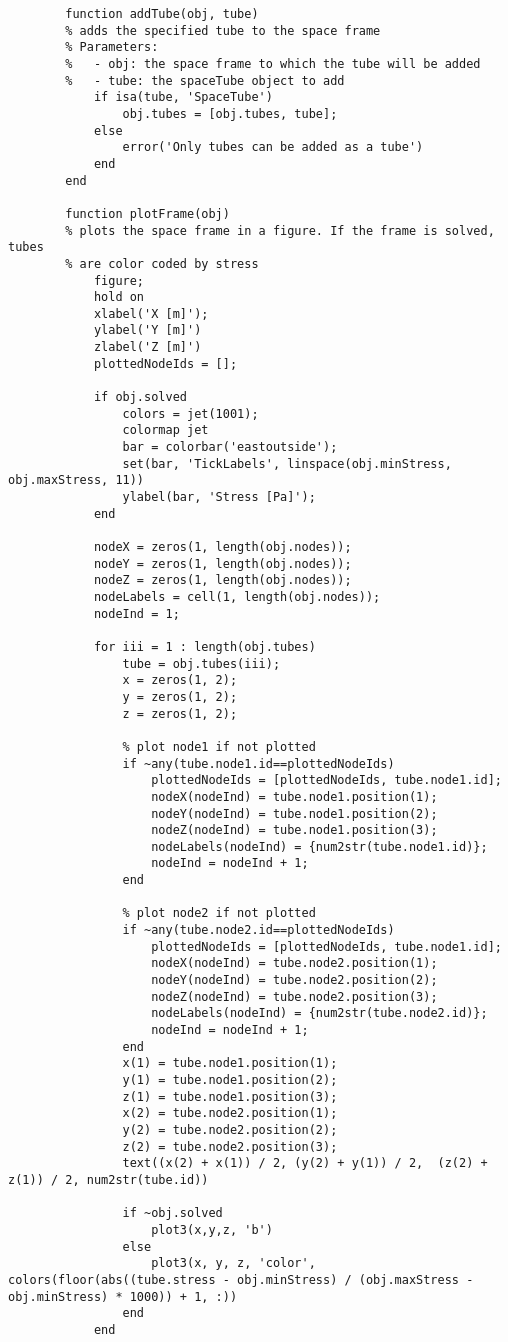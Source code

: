 \begin{lstlisting}
		function addTube(obj, tube)
		% adds the specified tube to the space frame
		% Parameters:
		%   - obj: the space frame to which the tube will be added
		%   - tube: the spaceTube object to add
			if isa(tube, 'SpaceTube')
				obj.tubes = [obj.tubes, tube];
			else
				error('Only tubes can be added as a tube')
			end
		end
		
		function plotFrame(obj)  
		% plots the space frame in a figure. If the frame is solved, tubes
		% are color coded by stress
			figure;
			hold on
			xlabel('X [m]');
			ylabel('Y [m]')
			zlabel('Z [m]')
			plottedNodeIds = [];
			
			if obj.solved
				colors = jet(1001);
				colormap jet
				bar = colorbar('eastoutside');
				set(bar, 'TickLabels', linspace(obj.minStress, obj.maxStress, 11))
				ylabel(bar, 'Stress [Pa]');
			end
			
			nodeX = zeros(1, length(obj.nodes));
			nodeY = zeros(1, length(obj.nodes));
			nodeZ = zeros(1, length(obj.nodes));
			nodeLabels = cell(1, length(obj.nodes));
			nodeInd = 1;
			
			for iii = 1 : length(obj.tubes)
				tube = obj.tubes(iii);
				x = zeros(1, 2);
				y = zeros(1, 2);
				z = zeros(1, 2);
				
				% plot node1 if not plotted
				if ~any(tube.node1.id==plottedNodeIds)
					plottedNodeIds = [plottedNodeIds, tube.node1.id]; 
					nodeX(nodeInd) = tube.node1.position(1);
					nodeY(nodeInd) = tube.node1.position(2);
					nodeZ(nodeInd) = tube.node1.position(3);
					nodeLabels(nodeInd) = {num2str(tube.node1.id)};
					nodeInd = nodeInd + 1;
				end
				
				% plot node2 if not plotted 
				if ~any(tube.node2.id==plottedNodeIds)
					plottedNodeIds = [plottedNodeIds, tube.node1.id];
					nodeX(nodeInd) = tube.node2.position(1);
					nodeY(nodeInd) = tube.node2.position(2);
					nodeZ(nodeInd) = tube.node2.position(3);
					nodeLabels(nodeInd) = {num2str(tube.node2.id)};
					nodeInd = nodeInd + 1;
				end
				x(1) = tube.node1.position(1);
				y(1) = tube.node1.position(2);
				z(1) = tube.node1.position(3);
				x(2) = tube.node2.position(1);
				y(2) = tube.node2.position(2);
				z(2) = tube.node2.position(3);
				text((x(2) + x(1)) / 2, (y(2) + y(1)) / 2,  (z(2) + z(1)) / 2, num2str(tube.id))
			
				if ~obj.solved
					plot3(x,y,z, 'b')
				else
					plot3(x, y, z, 'color', colors(floor(abs((tube.stress - obj.minStress) / (obj.maxStress - obj.minStress) * 1000)) + 1, :))
				end
			end
			

\end{lstlisting}
